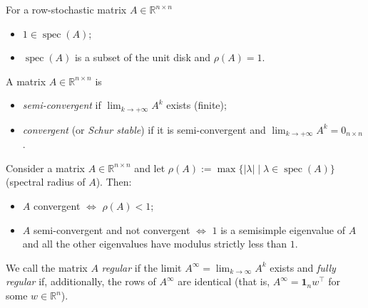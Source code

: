 \begin{theorem}
\label{thm:stoch-spectrum}
For a row-stochastic matrix $A \in \mathbb{R}^{n \times n}$
\begin{itemize}
  \item[(i)] $1 \in \operatorname{spec}(A)$;
  \item[(ii)] $\operatorname{spec}(A)$ is a subset of the unit disk and $\rho(A) = 1$.
\end{itemize}
\end{theorem}

\begin{definition}
\label{def:semiconv}
A matrix $A \in \mathbb{R}^{n \times n}$ is
\begin{itemize}
  \item[(i)] \emph{semi-convergent} if $\lim_{k \to +\infty} A^k$ exists (finite);
  \item[(ii)] \emph{convergent} (or \emph{Schur stable}) if it is semi-convergent and
              $\lim_{k \to +\infty} A^k = 0_{n \times n}$.
\end{itemize}
\end{definition}

\begin{theorem}
\label{thm:spectral-radius}
Consider a matrix $A \in \mathbb{R}^{n \times n}$ and let
$\rho(A) := \max\{|\lambda| \mid \lambda \in \operatorname{spec}(A)\}$ (spectral
radius of $A$). Then:
\begin{itemize}
  \item[(i)] $A$ convergent $\iff$ $\rho(A) < 1$;
  \item[(ii)] $A$ semi-convergent and not convergent $\iff$ $1$ is a semisimple
              eigenvalue of $A$ and all the other eigenvalues have modulus strictly
              less than $1$.
\end{itemize}
\end{theorem}

\begin{definition}
\label{def:regular}
We call the matrix $A$ \emph{regular} if the limit
$A^\infty = \lim_{k \to \infty} A^k$ exists and \emph{fully regular} if, additionally,
the rows of $A^\infty$ are identical (that is, $A^\infty = \mathbf{1}_n w^\top$ for some
$w \in \mathbb{R}^n$).
\end{definition}

